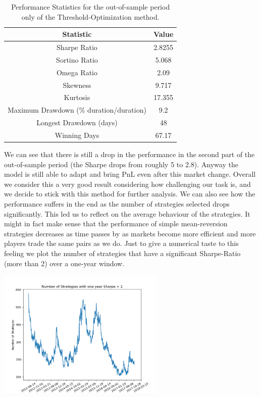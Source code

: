 \begin{table}
	\centering
	\begin{tabular}{c|c}
		\textbf{Statistic} & \textbf{Value} \\\hline
		Sharpe Ratio & 2.8255 \\ 
		Sortino Ratio & 5.068 \\ 
		Omega Ratio & 2.09 \\ 
		Skewness & 9.717 \\ 
		Kurtosis & 17.355 \\ 
		Maximum Drawdown (\% duration/duration) & 9.2 \\ 
		Longest Drawdown (days) & 48 \\ 
		Winning Days & 67.17 \\ 
	\end{tabular}
	\label{table:oos_perf_threshold_backtest}
	\caption{\label{table:oos_perf_threshold_backtest} Performance Statistics for the out-of-sample period only of the Threshold-Optimization method.}
\end{table}

We can see that there is still a drop in the performance in the second part of the out-of-sample period (the Sharpe drops from roughly 5 to 2.8). Anyway the model is still able to adapt and bring PnL even after this market change. Overall we consider this a very good result considering how challenging our task is, and we decide to stick with this method for further analysis. We can also see how the performance suffers in the end as the number of strategies selected drops significantly. This led us to reflect on the average behaviour of the strategies. It might in fact make sense that the performance of simple mean-reversion strategies decreases as time passes by as markets become more efficient and more players trade the same pairs as we do. Just to give a numerical taste to this feeling we plot the number of strategies that have a significant Sharpe-Ratio (more than 2) over a one-year window. 

\begin{center}
	\centering
	\includegraphics[width=0.6\textwidth]{Part_1/Number_of_Sharpes.png}
\end{center}

